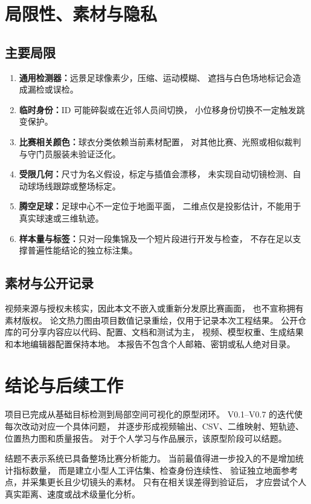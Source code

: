\documentclass[UTF8,fontset=fandol,11pt,a4paper]{ctexart}
\begin{document}
\section{局限性、素材与隐私}

\subsection{主要局限}
\begin{enumerate}
 \item \textbf{通用检测器：}远景足球像素少，压缩、运动模糊、
       遮挡与白色场地标记会造成漏检或误检。
 \item \textbf{临时身份：}ID 可能碎裂或在近邻人员间切换，
       小位移身份切换不一定触发跳变保护。
 \item \textbf{比赛相关颜色：}球衣分类依赖当前素材配置，
       对其他比赛、光照或相似裁判与守门员服装未验证泛化。
 \item \textbf{受限几何：}尺寸为名义假设，标定与插值会漂移，
       未实现自动切镜检测、自动球场线跟踪或整场标定。
 \item \textbf{腾空足球：}足球中心不一定位于地面平面，
       二维点仅是投影估计，不能用于真实球速或三维轨迹。
 \item \textbf{样本量与标签：}只对一段集锦及一个短片段进行开发与检查，
       不存在足以支撑普遍性能结论的独立标注集。
\end{enumerate}

\subsection{素材与公开记录}
视频来源与授权未核实，因此本文不嵌入或重新分发原比赛画面，
也不宣称拥有素材版权。
论文热力图由项目数值记录重绘，仅用于记录本次工程结果。
公开仓库的可分享内容应以代码、配置、文档和测试为主，
视频、模型权重、生成结果和本地编辑器配置保持本地。
本报告不包含个人邮箱、密钥或私人绝对目录。

\section{结论与后续工作}

项目已完成从基础目标检测到局部空间可视化的原型闭环。
V0.1--V0.7 的迭代使每次改动对应一个具体问题，
并逐步形成视频输出、CSV、二维映射、短轨迹、位置热力图和质量报告。
对于个人学习与作品展示，该原型阶段可以结题。

结题不表示系统已具备整场比赛分析能力。
当前最值得进一步投入的不是增加统计指标数量，
而是建立小型人工评估集、检查身份连续性、
验证独立地面参考点，并采集更长且少切镜头的素材。
只有在相关误差得到验证后，
才应尝试个人真实距离、速度或战术级量化分析。
\end{document}
